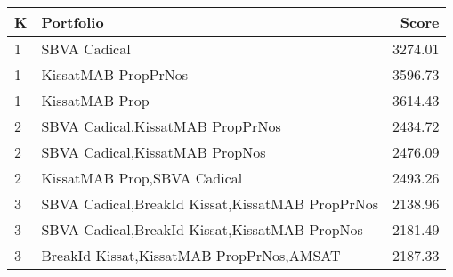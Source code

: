 \begin{tabular}{l|p{.9\linewidth}|r}
\toprule
K & Portfolio & Score \\
\midrule
1 & SBVA Cadical & 3274.01 \\
1 & KissatMAB PropPrNos & 3596.73 \\
1 & KissatMAB Prop & 3614.43 \\
2 & SBVA Cadical,KissatMAB PropPrNos & 2434.72 \\
2 & SBVA Cadical,KissatMAB PropNos & 2476.09 \\
2 & KissatMAB Prop,SBVA Cadical & 2493.26 \\
3 & SBVA Cadical,BreakId Kissat,KissatMAB PropPrNos & 2138.96 \\
3 & SBVA Cadical,BreakId Kissat,KissatMAB PropNos & 2181.49 \\
3 & BreakId Kissat,KissatMAB PropPrNos,AMSAT & 2187.33 \\
\bottomrule
\end{tabular}
